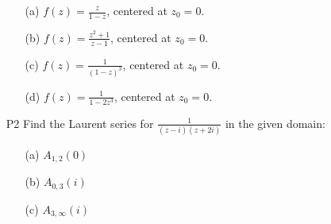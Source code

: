 \documentclass{article}
\begin{document}
\begin{itemize}
          \begin{itemize}
              \item [(a)] $f(z)=\frac{z}{1-z}$, centered at $z_0=0$.
              \item [(b)] $f(z)=\frac{z^2+1}{z-1}$, centered at $z_0=0$.
              \item [(c)] $f(z)=\frac{1}{(1-z)^3}$, centered at $z_0=0$.
              \item [(d)] $f(z)=\frac{1}{1-2z^3}$, centered at $z_0=0$.
          \end{itemize}
    \item [P2] Find the Laurent series for $\frac{1}{(z-i)(z+2i)}$ in the given domain:
          \begin{itemize}
              \item [(a)] $A_{1,2}(0)$
              \item [(b)] $A_{0,3}(i)$
              \item [(c)] $A_{3,\infty}(i)$
          \end{itemize}
\end{itemize}
\end{document}
